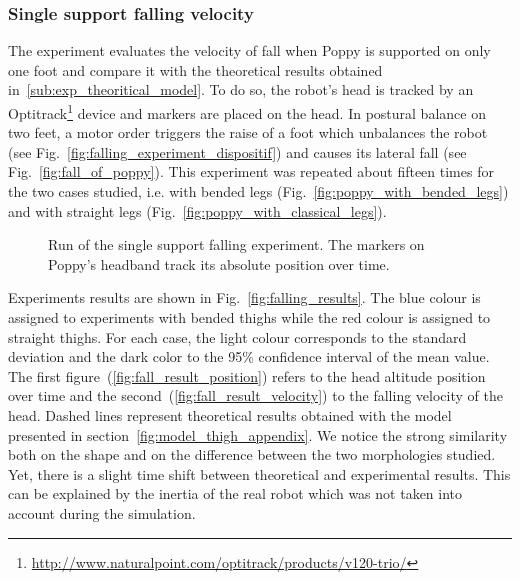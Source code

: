 \subsubsection{Single support falling velocity} %
\label{ssub:falling_velocity}
The experiment evaluates the velocity of fall when Poppy is supported on only one foot and compare it with the theoretical results obtained in~\ref{sub:exp_theoritical_model}. To do so, the robot's head is tracked by an Optitrack\footnote{\url{http://www.naturalpoint.com/optitrack/products/v120-trio/}} device and markers are placed on the head. In postural balance on two feet, a motor order triggers the raise of a foot which unbalances the robot (see Fig.~\ref{fig:falling_experiment_dispositif}) and causes its lateral fall (see Fig.~\ref{fig:fall_of_poppy}). This experiment was repeated about fifteen times for the two cases studied, i.e. with bended legs (Fig.~\ref{fig:poppy_with_bended_legs}) and with straight legs (Fig.~\ref{fig:poppy_with_classical_legs}).

\begin{figure}[ht]
\centering
    \hfil
    \caption{Run of the single support falling experiment.
    The markers on Poppy’s headband track its absolute position over time.}
    \label{fig:falling_experiment}
\end{figure}

Experiments results are shown in Fig.~\ref{fig:falling_results}. The blue colour is assigned to experiments with bended thighs while the red colour is assigned to straight thighs. For each case, the light colour corresponds to the standard deviation and the dark color to the 95\% confidence interval of the mean value. The first figure~(\ref{fig:fall_result_position}) refers to the head altitude position over time and the second~(\ref{fig:fall_result_velocity}) to the falling velocity of the head. Dashed lines represent theoretical results obtained with the model presented in section~\ref{fig:model_thigh_appendix}. We notice the strong similarity both on the shape and on the difference between the two morphologies studied. Yet, there is a slight time shift between theoretical and experimental results. This can be explained by the inertia of the real robot which was not taken into account during the simulation.

